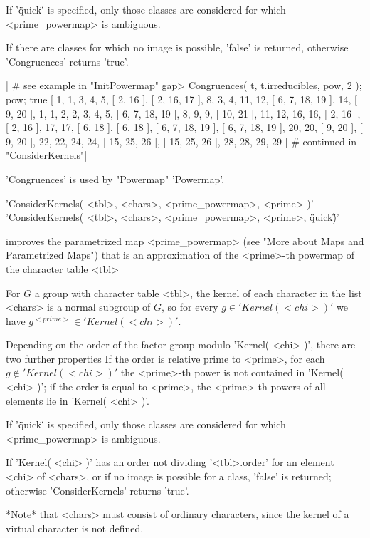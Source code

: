 If '\"quick\"' is specified, only those classes are considered for which
<prime\_powermap> is ambiguous.

If there are classes for which no image is possible, 'false' is returned,
otherwise 'Congruences' returns 'true'.

|    # see example in "InitPowermap"
    gap> Congruences( t, t.irreducibles, pow, 2 ); pow;
    true
    [ 1, 1, 3, 4, 5, [ 2, 16 ], [ 2, 16, 17 ], 8, 3, 4, 11, 12,
      [ 6, 7, 18, 19 ], 14, [ 9, 20 ], 1, 1, 2, 2, 3, 4, 5,
      [ 6, 7, 18, 19 ], 8, 9, 9, [ 10, 21 ], 11, 12, 16, 16, [ 2, 16 ],
      [ 2, 16 ], 17, 17, [ 6, 18 ], [ 6, 18 ], [ 6, 7, 18, 19 ],
      [ 6, 7, 18, 19 ], 20, 20, [ 9, 20 ], [ 9, 20 ], 22, 22, 24, 24,
      [ 15, 25, 26 ], [ 15, 25, 26 ], 28, 28, 29, 29 ]
    # continued in "ConsiderKernels"|

'Congruences' is used by "Powermap" 'Powermap'.


'ConsiderKernels( <tbl>, <chars>, <prime\_powermap>, <prime> )'\\
'ConsiderKernels( <tbl>, <chars>, <prime\_powermap>, <prime>, \"quick\" )'

improves the parametrized map <prime\_powermap> (see "More about Maps and
Parametrized Maps") that is an approximation of the <prime>-th powermap of
the character table <tbl>\:

For $G$ a group with character table <tbl>, the kernel of each character in
the list <chars> is a normal subgroup of $G$, so for every
$g \in 'Kernel( <chi> )'$ we have $g^{<prime>} \in 'Kernel( <chi> )'$.

Depending on the order of the factor group modulo 'Kernel( <chi> )',
there are two further properties\: If the order is relative prime to <prime>,
for each $g \notin 'Kernel( <chi> )'$ the <prime>-th power is not contained
in 'Kernel( <chi> )'; if the order is equal to <prime>, the <prime>-th powers
of all elements lie in 'Kernel( <chi> )'.

If '\"quick\"' is specified, only those classes are considered for which
<prime\_powermap> is ambiguous.

If 'Kernel( <chi> )' has an order not dividing '<tbl>.order' for an element
<chi> of <chars>, or if no image is possible for a class,
'false' is returned; otherwise 'ConsiderKernels' returns 'true'.

*Note* that <chars> must consist of ordinary characters, since the kernel of
a virtual character is not defined.

